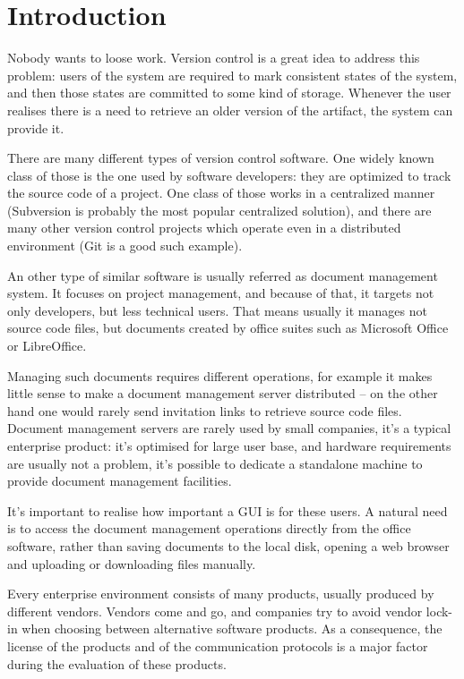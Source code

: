 \section{Introduction}

Nobody wants to loose work. Version control is a great idea to address this
problem: users of the system are required to mark consistent states of the
system, and then those states are committed to some kind of storage. Whenever
the user realises there is a need to retrieve an older version of the artifact,
the system can provide it.

There are many different types of version control software. One widely known
class of those is the one used by software developers: they are optimized to
track the source code of a project. One class of those works in a centralized
manner (Subversion\cite{subversion} is probably the most popular centralized
solution), and there are many other version control projects which operate even
in a distributed environment (Git\cite{git} is a good such example).

An other type of similar software is usually referred as document management
system. It focuses on project management, and because of that, it targets not
only developers, but less technical users. That means usually it manages not
source code files, but documents created by office suites such as Microsoft
Office or LibreOffice.

Managing such documents requires different operations, for example it makes
little sense to make a document management server distributed -- on the other
hand one would rarely send invitation links to retrieve source code files.
Document management servers are rarely used by small companies, it's a typical
enterprise product: it's optimised for large user base, and hardware
requirements are usually not a problem, it's possible to dedicate a standalone
machine to provide document management facilities.

It's important to realise how important a GUI is for these users. A natural
need is to access the document management operations directly from the office
software, rather than saving documents to the local disk, opening a web browser
and uploading or downloading files manually.

Every enterprise environment consists of many products, usually produced by
different vendors. Vendors come and go, and companies try to avoid vendor
lock-in when choosing between alternative software products. As a consequence,
the license of the products and of the communication protocols is a major
factor during the evaluation of these products.

